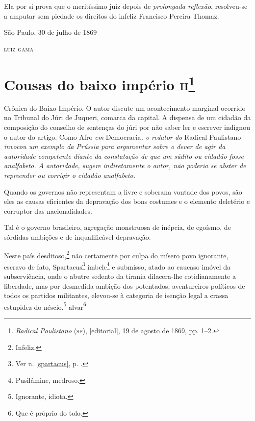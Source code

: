 Ela por si prova que o meritíssimo juiz depois de \emph{prolongada
reflexão}, resolveu-se a amputar sem piedade os direitos do infeliz
Francisco Pereira Thomaz.

\begin{flushright}
São Paulo, 30 de julho de 1869

\textsc{luiz gama}
\end{flushright}

\chapter{Cousas do baixo império \textsc{ii}\footnote{\emph{Radical
  Paulistano} (\textsc{sp}), {[}editorial{]}, 19 de agosto de 1869, pp. 1--2.}}

\begin{didascalia}
Crônica do Baixo Império. O autor discute um acontecimento marginal
ocorrido no Tribunal do Júri de Juqueri, comarca da capital. A dispensa
de um cidadão da composição do conselho de sentenças do júri por não
saber ler e escrever indignou o autor do artigo. Como Afro \emph{em}
Democracia\emph{, o redator do} Radical Paulistano \emph{invocou um
exemplo da Prússia para argumentar sobre o dever de agir da autoridade
competente diante da constatação de que um súdito ou cidadão fosse
analfabeto. A autoridade, sugere indiretamente o autor, não poderia se
abster de repreender ou corrigir o cidadão analfabeto.}
\end{didascalia}



Quando os governos não representam a livre e soberana vontade dos povos,
são eles as causas eficientes da depravação dos bons costumes e o
elemento deletério e corruptor das nacionalidades.

Tal é o governo brasileiro, agregação monstruosa de inépcia, de egoísmo,
de sórdidas ambições e de inqualificável depravação.

Neste país desditoso,\footnote{Infeliz.} não certamente por culpa do
mísero povo ignorante, escravo de fato, Spartacus\footnote{Ver n. \ref{spartacus}, 
p. \pageref{spartacus}.} imbele\footnote{Pusilâmine, medroso.} e
submisso, atado ao caucaso imóvel da subserviência, onde o abutre
sedento da tirania dilacera-lhe cotidianamente a liberdade, mas por
desmedida ambição dos potentados, aventureiros políticos de todos os
partidos militantes, elevou-se à categoria de isenção legal a crassa
estupidez do néscio.\footnote{Ignorante, idiota.} alvar\footnote{Que
  é próprio do tolo.}

